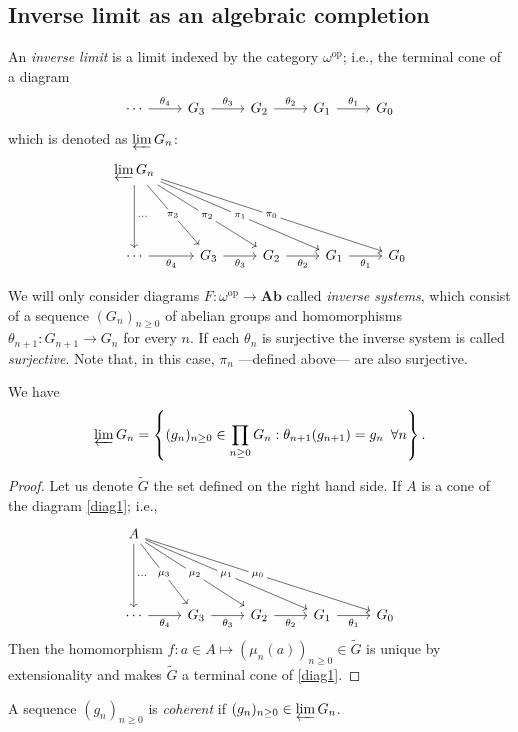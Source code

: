 \subsection{Inverse limit as an algebraic completion}
\begin{defi}
    An \emph{inverse limit} is a limit indexed by the category $\omega^{\text{op}}$; i.e., the terminal cone of a diagram
    \begin{equation}\label{diag1}
    \begin{tikzcd}
     \cdots\ar[r, "\theta_{4}"] & G_3 \ar[r, "\theta_{3}"] & G_2 \ar[r, "\theta_{2}"] & G_1 \ar[r, "\theta_{1}"] & G_0
    \end{tikzcd}
    \end{equation}
    which is denoted as $\varprojlim G_n$:
    \[
    \begin{tikzcd}
    \varprojlim G_n \ar[dd, "\cdots"] \ar[ddr, "\pi_3" description] \ar[ddrr, "\pi_2" description] \ar[ddrrr, "\pi_1" description] \ar[ddrrrr, "\pi_0" description]\\
    {}\\
     \cdots\ar[r, "\theta_{4}"'] & G_3 \ar[r, "\theta_{3}"'] & G_2 \ar[r, "\theta_{2}"'] & G_1 \ar[r, "\theta_{1}"'] & G_0
    \end{tikzcd}
    \]
\end{defi}

We will only consider diagrams $F\colon \omega^{\text{op}}\to \mathbf{Ab}$ called \emph{inverse systems}, which consist of a sequence $(G_n)_{n\geq 0}$ of abelian groups and homomorphisms $\theta_{n+1}\colon G_{n+1}\to G_n$ for every $n$. If each $\theta_n$ is surjective the inverse system is called \emph{surjective}. Note that, in this case, $\pi_n$ ---defined above--- are also surjective.
\begin{thm}\label{varprojalg}
    We have 
    \[
    \varprojlim G_n=\left\{(g_n)_{n\geq 0}\in \prod_{n\geq 0}G_n : \theta_{n+1}(g_{n+1})=g_n \,\,\,\forall n\right\}.
    \]
\end{thm}
\begin{proof}
    Let us denote $\widetilde G$ the set defined on the right hand side. If $A$ is a cone of the diagram \ref{diag1}; i.e.,
    \[
    \begin{tikzcd}
    A \ar[dd, "\cdots"] \ar[ddr, "\mu_3" description] \ar[ddrr, "\mu_2" description] \ar[ddrrr, "\mu_1" description] \ar[ddrrrr, "\mu_0" description]\\
    {}\\
     \cdots\ar[r, "\theta_{4}"'] & G_3 \ar[r, "\theta_{3}"'] & G_2 \ar[r, "\theta_{2}"'] & G_1 \ar[r, "\theta_{1}"'] & G_0
    \end{tikzcd}
    \]
    Then the homomorphism $f\colon a\in A \mapsto (\mu_n(a))_{n\geq 0}\in \widetilde G$ is unique by extensionality and makes $\widetilde G$ a terminal cone of \eqref{diag1}.
\end{proof}
\begin{defi}
     A sequence $(g_n)_{n\geq 0}$ is \emph{coherent} if $(g_n)_{n\geq 0}\in\varprojlim G_n$.
\end{defi}

